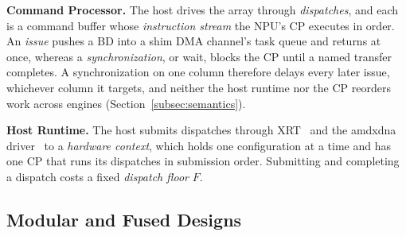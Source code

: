 \textbf{Command Processor.}
The host drives the array through \emph{dispatches}, and each is a command buffer whose \emph{instruction stream} the NPU's CP executes in order.
An \emph{issue} pushes a BD into a shim DMA channel's task queue and returns at once, whereas a \emph{synchronization}, or wait, blocks the CP until a named transfer completes.
A synchronization on one column therefore delays every later issue, whichever column it targets, and neither the host runtime nor the CP reorders work across engines (Section~\ref{subsec:semantics}).

\textbf{Host Runtime.}
The host submits dispatches through XRT~\citep{xrt-repo} and the amdxdna driver~\citep{xdna-driver} to a \emph{hardware context}, which holds one configuration at a time and has one CP that runs its dispatches in submission order.
Submitting and completing a dispatch costs a fixed \emph{dispatch floor} $F$.

\subsection{Modular and Fused Designs}
\label{subsec:spectrum}

